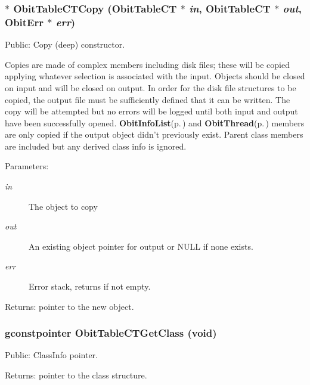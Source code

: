\subsubsection{$\ast$ Obit\-Table\-CTCopy ({\bf Obit\-Table\-CT} $\ast$ {\em in}, {\bf Obit\-Table\-CT} $\ast$ {\em out}, {\bf Obit\-Err} $\ast$ {\em err})}\label{ObitTableCT_8c_a20}


Public: Copy (deep) constructor. 

Copies are made of complex members including disk files; these will be copied applying whatever selection is associated with the input. Objects should be closed on input and will be closed on output. In order for the disk file structures to be copied, the output file must be sufficiently defined that it can be written. The copy will be attempted but no errors will be logged until both input and output have been successfully opened. {\bf Obit\-Info\-List}{\rm (p.\,\pageref{structObitInfoList})} and {\bf Obit\-Thread}{\rm (p.\,\pageref{structObitThread})} members are only copied if the output object didn't previously exist. Parent class members are included but any derived class info is ignored. \begin{Desc}
\item[Parameters:]
\begin{description}
\item[{\em in}]The object to copy \item[{\em out}]An existing object pointer for output or NULL if none exists. \item[{\em err}]Error stack, returns if not empty. \end{description}
\end{Desc}
\begin{Desc}
\item[Returns:]pointer to the new object. \end{Desc}
\subsubsection{\setlength{\rightskip}{0pt plus 5cm}gconstpointer Obit\-Table\-CTGet\-Class (void)}\label{ObitTableCT_8c_a17}


Public: Class\-Info pointer. 

\begin{Desc}
\item[Returns:]pointer to the class structure. \end{Desc}
